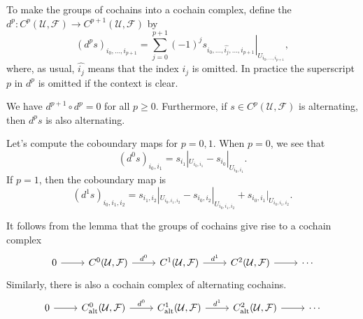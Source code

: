 To make the groups of cochains into a cochain complex, define the  $d^p \colon C^p(\mathcal{U}, \mathcal{F}) \to C^{p + 1}(\mathcal{U}, \mathcal{F})$ by 
\begin{equation*}
	(d^p s)_{i_0, \dotsc, i_{p + 1}} = \sum_{j = 0}^{p + 1} (-1)^j \left.s_{i_0, \dotsc, \widehat{i_j}, \dotsc, i_{p + 1}}\right|_{U_{i_0, \dotsc, i_{p + 1}}},
\end{equation*}
where, as usual, $\widehat{i_j}$ means that the index $i_j$ is omitted. In practice the superscript $p$ in $d^p$ is omitted if the context is clear.

\begin{lemma}
	We have $d^{p + 1} \circ d^p = 0$ for all $p \geq 0$. Furthermore, if $s \in C^p(\mathcal{U}, \mathcal{F})$ is alternating, then $d^ps$ is also alternating. 
\end{lemma}

\begin{example}\label{chap15:coboundary-maps-for-0-1}
	Let's compute the coboundary maps for $p = 0, 1$. When $p = 0$, we see that
	\begin{equation*}
		(d^0 s)_{i_0, i_1} = s_{i_1}|_{U_{i_0, i_1}} - s_{i_0}|_{U_{i_0, i_1}}.
	\end{equation*}
	If $p = 1$, then the coboundary map is 
	\begin{equation*}
		(d^1 s)_{i_0, i_1, i_2} = s_{i_1, i_2}|_{U_{i_0, i_1, i_2}} - s_{i_0, i_2}|_{U_{i_0, i_1, i_2}} + s_{i_0, i_1}|_{U_{i_0, i_1, i_2}}.
	\end{equation*}
	
\end{example}

It follows from the lemma that the groups of cochains give rise to a cochain complex
\[\begin{tikzcd}
	0 & {C^0(\mathcal{U}, \mathcal{F})} & {C^1(\mathcal{U}, \mathcal{F})} & {C^2(\mathcal{U}, \mathcal{F})} & \dotsb
	\arrow[from=1-1, to=1-2]
	\arrow["{d^0}", from=1-2, to=1-3]
	\arrow["{d^1}", from=1-3, to=1-4]
	\arrow[from=1-4, to=1-5]
\end{tikzcd}\]
Similarly, there is also a cochain complex of alternating cochains.
\[\begin{tikzcd}
	0 & {C_{\alt}^0(\mathcal{U}, \mathcal{F})} & {C_{\alt}^1(\mathcal{U}, \mathcal{F})} & {C_{\alt}^2(\mathcal{U}, \mathcal{F})} & \dotsb
	\arrow[from=1-1, to=1-2]
	\arrow["{d^0}", from=1-2, to=1-3]
	\arrow["{d^1}", from=1-3, to=1-4]
	\arrow[from=1-4, to=1-5]
\end{tikzcd}\]

